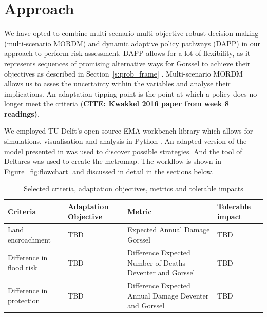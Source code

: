 \section{Approach}
\label{s:approach}



We have opted to combine multi scenario multi-objective robust decision making (multi-scenario MORDM) and dynamic adaptive policy pathways (DAPP) in our approach to perform risk assessment. DAPP allows for a lot of flexibility, as it represents sequences of promising alternative ways for Gorssel to achieve their objectives as described in Section~\ref{s:prob_frame} \citep{Walker2013}. Multi-scenario MORDM allows us to asses the uncertainty within the variables and analyse their implications. An adaptation tipping point is the point at which a policy does no longer meet the criteria (\textbf{CITE: Kwakkel 2016 paper from week 8 readings)}.

We employed TU Delft's open source EMA workbench library which allows for simulations, visualisation and analysis in Python \parencite{kwakkel_exploratory_2017}. An adapted version of the model presented in  was used to discover possible strategies. And the tool of Deltares was used to create the metromap. The workflow is shown in Figure~\ref{fig:flowchart} and discussed in detail in the sections below.

\begin{longtable}[c]{p{2cm}p{2cm}p{5cm}l}
\caption{Selected criteria, adaptation objectives, metrics and tolerable impacts}
\label{tab:criteria}\\
\textbf{Criteria}        & \textbf{Adaptation Objective} & \textbf{Metric}                                           & \textbf{Tolerable impact} \\
\hline
\endfirsthead
%
\endhead
%
Land encroachment & TBD & Expected Annual Damage Gorssel & TBD \\
Difference in flood risk & TBD & Difference Expected Number of Deaths Deventer and Gorssel & TBD\\
Difference in protection & TBD & Difference Expected Annual Damage Deventer and Gorssel & TBD
\end{longtable}


